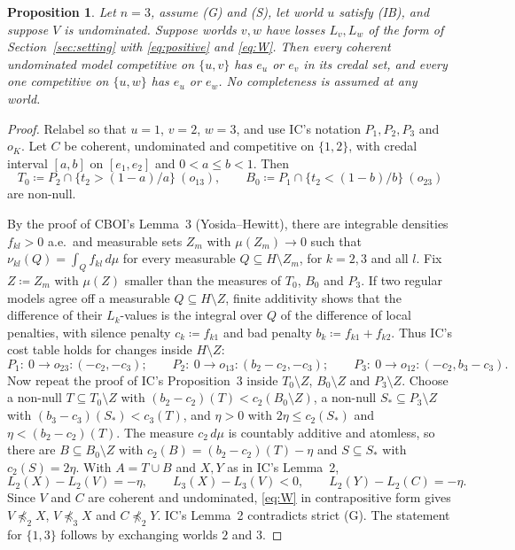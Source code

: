 \documentclass[11pt]{article}
\newtheorem{proposition}[theorem]{Proposition}
\theoremstyle{definition}\newtheorem{definition}[theorem]{Definition}
\theoremstyle{remark}\newtheorem{remark}[theorem]{Remark}
\begin{document}
\begin{proposition}\label{prop:FA}
Let $n=3$, assume (G) and (S), let world $u$ satisfy (IB), and suppose $V$ is
undominated. Suppose worlds $v,w$ have losses $L_v,L_w$ of the form of
Section~\ref{sec:setting} with \eqref{eq:positive} and \eqref{eq:W}. Then
every coherent undominated model competitive on $\{u,v\}$ has $e_u$ or $e_v$
in its credal set, and every one competitive on $\{u,w\}$ has $e_u$ or
$e_w$. No completeness is assumed at any world.
\end{proposition}
\begin{proof}
Relabel so that $u=1$, $v=2$, $w=3$, and use IC's notation $P_1,P_2,P_3$ and
$o_K$. Let $C$ be coherent, undominated and competitive on $\{1,2\}$, with
credal interval $[a,b]$ on $[e_1,e_2]$ and $0<a\le b<1$. Then
\[
 T_0\coloneqq P_2\cap\{t_2>(1-a)/a\}\ (o_{13}),\qquad
 B_0\coloneqq P_1\cap\{t_2<(1-b)/b\}\ (o_{23})
\]
are non-null.

By the proof of CBOI's Lemma~3 (Yosida--Hewitt), there are integrable densities
$f_{kl}>0$ a.e.\ and measurable sets $Z_m$ with $\mu(Z_m)\to0$ such that
$\nu_{kl}(Q)=\int_Qf_{kl}\,d\mu$ for every measurable $Q\subseteq H\setminus
Z_m$, for $k=2,3$ and all $l$. Fix $Z\coloneqq Z_m$ with $\mu(Z)$ smaller
than the measures of $T_0$, $B_0$ and $P_3$. If two regular models agree off
a measurable $Q\subseteq H\setminus Z$, finite additivity shows that the
difference of their $L_k$-values is the integral over $Q$ of the difference
of local penalties, with silence penalty $c_k\coloneqq f_{k1}$ and bad
penalty $b_k\coloneqq f_{k1}+f_{k2}$. Thus IC's cost table holds for changes
inside $H\setminus Z$:
\[
 P_1:\ 0\to o_{23}\colon(-c_2,-c_3);\qquad
 P_2:\ 0\to o_{13}\colon(b_2-c_2,-c_3);\qquad
 P_3:\ 0\to o_{12}\colon(-c_2,b_3-c_3).
\]
Now repeat the proof of IC's Proposition~3 inside $T_0\setminus Z$,
$B_0\setminus Z$ and $P_3\setminus Z$. Choose a non-null
$T\subseteq T_0\setminus Z$ with $(b_2-c_2)(T)<c_2(B_0\setminus Z)$, a
non-null $S_*\subseteq P_3\setminus Z$ with $(b_3-c_3)(S_*)<c_3(T)$, and
$\eta>0$ with $2\eta\le c_2(S_*)$ and $\eta<(b_2-c_2)(T)$. The measure
$c_2\,d\mu$ is countably additive and atomless, so there are
$B\subseteq B_0\setminus Z$ with $c_2(B)=(b_2-c_2)(T)-\eta$ and
$S\subseteq S_*$ with $c_2(S)=2\eta$. With $A=T\cup B$ and $X,Y$ as in IC's
Lemma~2,
\[
 L_2(X)-L_2(V)=-\eta,\qquad L_3(X)-L_3(V)<0,\qquad L_2(Y)-L_2(C)=-\eta.
\]
Since $V$ and $C$ are coherent and undominated, \eqref{eq:W} in contrapositive
form gives $V\not\preceq_2X$, $V\not\preceq_3X$ and $C\not\preceq_2Y$. IC's
Lemma~2 contradicts strict (G). The statement for $\{1,3\}$ follows by
exchanging worlds $2$ and $3$.
\end{proof}
\end{document}

